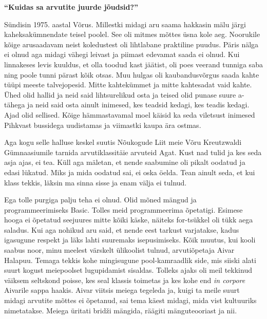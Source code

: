 
\textbf{\enquote{Kuidas sa arvutite juurde jõudsid?}}

Sündisin 1975. aastal Võrus. Millestki midagi aru saama hakkasin 
mälu järgi kaheksakümnendate teisel poolel. See oli mitmes mõttes üsna kole 
aeg. Noorukile kõige arusaadavam neist koledustest oli lihtlabane praktiline 
puudus. Päris nälga ei olnud aga midagi vähegi leivast ja piimast edevamat 
saada ei olnud. Kui linnakeses levis kuuldus, et olla toodud kast jäätist, oli 
poes veerand tunniga saba ning poole tunni pärast kõik otsas. Muu hulgas oli 
kaubandusvõrgus saada kahte tüüpi meeste talvejopesid. Mitte kahtekümmet ja 
mitte kahtesadat vaid kahte. Ühed olid hallid ja neid said lihtsurelikud 
osta ja teised olid punase suure a-tähega ja neid said osta 
ainult inimesed, kes teadsid kedagi, kes teadis kedagi. Ajad olid sellised. 
Kõige hämmastavamal moel käisid ka seda viletsust inimesed Pihkvast bussidega 
uudistamas ja viimastki kaupa ära ostmas. 

Aga kogu selle halluse keskel suutis Nõukogude Liit meie Võru Kreutzwaldi 
Gümnaasiumile tarnida 
arvutiklassitäie arvuteid Agat. Kust nad tulid ja kes 
seda asja ajas, ei tea. Küll aga mäletan, et nende saabumine oli pikalt oodatud 
ja edasi lükatud. Miks ja mida oodatud sai, ei oska öelda. Tean ainult seda, et 
kui klass tekkis, läksin ma sinna sisse ja enam välja ei tulnud. 

Ega tolle purgiga palju teha ei olnud. Olid mõned mängud ja programmeerimiseks 
Basic. Tolles meid programmeerima õpetatigi. Esimese hooga ei õpetatud 
seejuures mitte kõiki käske, näiteks for-tsükkel oli tükk aega saladus. Kui aga 
nohikud aru said, et nende eest tarkust varjatakse, kadus igasugune respekt ja 
läks lahti suuremaks isepusimiseks. Kõik muutus, kui kooli saabus noor, minu 
meelest värskelt ülikoolist tulnud, arvutiõpetaja Aivar 
Halapuu. Temaga tekkis kohe mingisugune 
pool-kamraadlik side, mis siiski alati suurt kogust meiepoolset lugupidamist 
sisaldas. Tolleks ajaks oli meil tekkinud väiksem seltskond poisse, kes seal 
klassis toimetas ja kes kohe end \emph{in corpore} Aivarile sappa haakis. Aivar 
viitsis meiega tegeleda ja, kuigi ta meile suurt midagi arvutite mõttes ei 
õpetanud, sai tema käest midagi, mida vist kultuuriks nimetatakse. Meiega 
üritati bridži mängida, räägiti mänguteooriast ja nii. 

